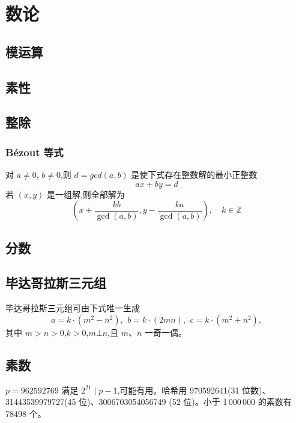 \chapter{数论}

\section{模运算}

\section{素性}

\section{整除}

	\subsection{Bézout 等式}
	对 $a \neq 0$, $b \neq 0$,则 $d=gcd(a,b)$ 是使下式存在整数解的最小正整数
	$$ax+by=d$$
	若 $(x,y)$ 是一组解,则全部解为
	$$\left(x+\frac{kb}{\gcd(a,b)}, y-\frac{ka}{\gcd(a,b)}\right), \quad k\in\mathbb{Z}$$


\section{分数}

\section{毕达哥拉斯三元组}
 毕达哥拉斯三元组可由下式唯一生成
 \[ a=k\cdot (m^{2}-n^{2}),\ \,b=k\cdot (2mn),\ \,c=k\cdot (m^{2}+n^{2}), \]
 其中 $m > n > 0$,$k > 0$,$m \bot n$,且 $m$、$n$ 一奇一偶。

\section{素数}
	$p=962592769$ 满足 $2^{21} \mid p-1$,可能有用。哈希用
	970592641(31 位数)、31443539979727(45 位)、3006703054056749
	(52 位)。小于 1\,000\,000 的素数有 78498 个。


